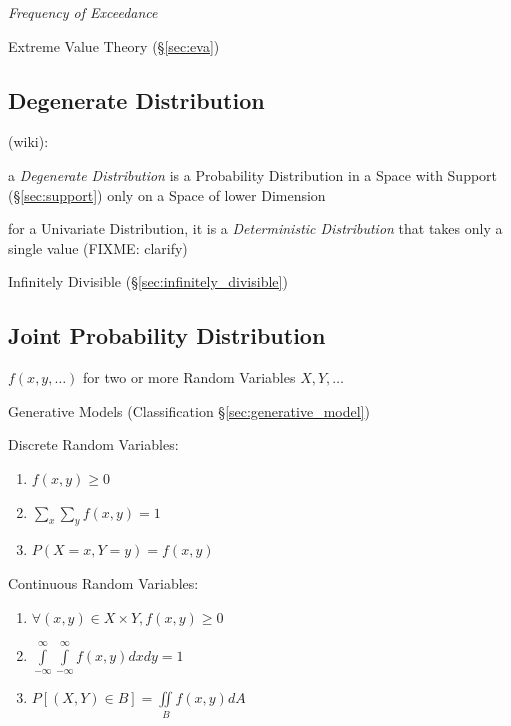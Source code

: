 \emph{Frequency of Exceedance}

Extreme Value Theory (\S\ref{sec:eva})



\subsection{Degenerate Distribution}\label{sec:degenerate_distribution}

(wiki):

a \emph{Degenerate Distribution} is a Probability Distribution in a Space with
Support (\S\ref{sec:support}) only on a Space of lower Dimension

for a Univariate Distribution, it is a \emph{Deterministic Distribution} that
takes only a single value (FIXME: clarify)

Infinitely Divisible (\S\ref{sec:infinitely_divisible})



\subsection{Joint Probability Distribution}\label{sec:joint_probability}

$f(x,y,\ldots)$ for two or more Random Variables $X,Y,\ldots$

\fist Generative Models (Classification \S\ref{sec:generative_model})

Discrete Random Variables:
\begin{enumerate}
  \item $f(x,y) \geq 0$
  \item $\sum_x \sum_y f(x,y) = 1$
  \item $P(X = x, Y = y) = f(x,y)$
\end{enumerate}

Continuous Random Variables:
\begin{enumerate}
  \item $\forall (x,y) \in X \times Y, f(x,y) \geq 0$
  \item $\int\limits_{-\infty}^{\infty} \int\limits_{-\infty}^{\infty}
    f(x,y) dx dy = 1$
  \item $P[(X,Y) \in B] = \iint\limits_B f(x,y) dA$
\end{enumerate}

